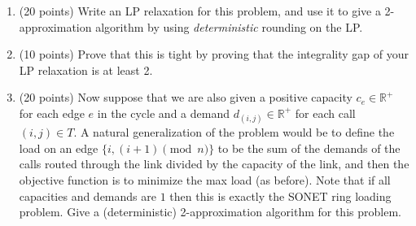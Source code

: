 \documentclass[11pt]{article}
\newcommand{\R}{\ensuremath{\mathbb R}}
\begin{document}
\begin{enumerate}
\item (20 points) Write an LP relaxation for this problem, and use it to give a 2-approximation algorithm by using \emph{deterministic} rounding on the LP.

\item (10 points) Prove that this is tight by proving that the integrality gap of your LP relaxation is at least 2.

\item (20 points) Now suppose that we are also given a positive capacity $c_e \in \R^+$ for each edge $e$ in the cycle and a demand $d_{(i,j)} \in \R^+$ for each call $(i,j) \in T$.  A natural generalization of the problem would be to define the load on an edge $\{i, (i+1)\pmod n\}$ to be the sum of the demands of the calls routed through the link divided by the capacity of the link, and then the objective function is to minimize the max load (as before).  Note that if all capacities and demands are $1$ then this is exactly the SONET ring loading problem.  Give a (deterministic) 2-approximation algorithm for this problem.  
\end{enumerate}
\end{document}
